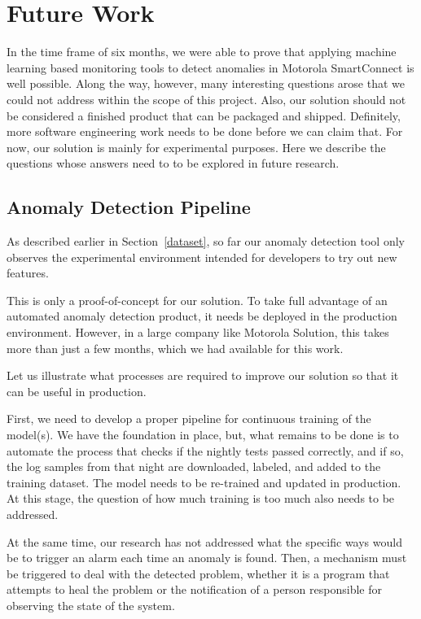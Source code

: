 \section{Future Work}
In the time frame of six months, we were able to prove that applying machine learning based monitoring tools to detect anomalies in Motorola SmartConnect is well possible.
Along the way, however, many interesting questions arose that we could not address within the scope of this project.
Also, our solution should not be considered a finished product that can be packaged and shipped. Definitely, more software engineering work needs to be done before we can claim that. For now, our solution is mainly for experimental purposes.
Here we describe the questions whose answers need to to be explored in future research.

\subsection{Anomaly Detection Pipeline}
\label{future:pipeline}
As described earlier in Section~\ref{dataset}, so far our anomaly detection tool only observes the experimental environment intended for developers to try out new features. 

This is only a proof-of-concept for our solution. To take full advantage of an automated anomaly detection product, it needs be deployed in the production environment. However, in a large company like Motorola Solution, this takes more than just a few months, which we had available for this work.

Let us illustrate what processes are required to improve our solution so that it can be useful in production.

First, we need to develop a proper pipeline for continuous training of the model(s). We have the foundation in place, but, what remains to be done is to automate the process that checks if the nightly tests passed correctly, and if so, the log samples from that night are downloaded, labeled, and added to the training dataset. The model needs to be re-trained and updated in production. At this stage, the question of how much training is too much also needs to be addressed.

At the same time, our research has not addressed what the specific ways would be to trigger an alarm  each time an anomaly is found. Then, a mechanism must be triggered to deal with the detected problem, whether it is a program that attempts to heal the problem or the notification of a person responsible for observing the state of the system.

